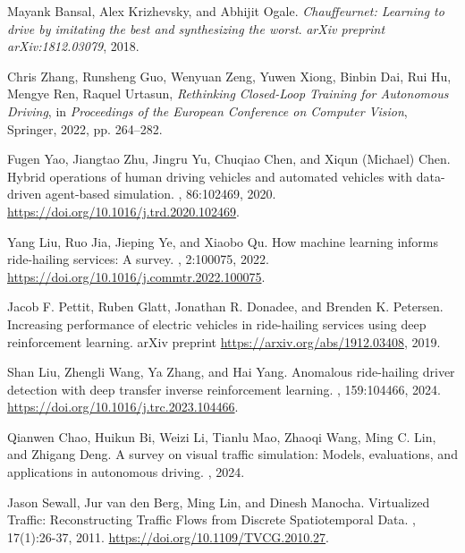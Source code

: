 \documentclass[lettersize,journal]{IEEEtran}
\begin{document}
\begin{thebibliography}{1}
Mayank Bansal, Alex Krizhevsky, and Abhijit Ogale.
\newblock \emph{Chauffeurnet: Learning to drive by imitating the best and synthesizing the worst}.
\newblock \emph{arXiv preprint arXiv:1812.03079}, 2018.

Chris Zhang, Runsheng Guo, Wenyuan Zeng, Yuwen Xiong, Binbin Dai, Rui Hu, Mengye Ren, Raquel Urtasun,
\textit{Rethinking Closed-Loop Training for Autonomous Driving}, in \textit{Proceedings of the European Conference on Computer Vision}, Springer, 2022, pp. 264--282.


Fugen Yao, Jiangtao Zhu, Jingru Yu, Chuqiao Chen, and Xiqun (Michael) Chen.
\newblock Hybrid operations of human driving vehicles and automated vehicles with data-driven agent-based simulation.
, 86:102469, 2020.
\newblock \url{https://doi.org/10.1016/j.trd.2020.102469}.

Yang Liu, Ruo Jia, Jieping Ye, and Xiaobo Qu.
\newblock How machine learning informs ride-hailing services: A survey.
, 2:100075, 2022.
\newblock \url{https://doi.org/10.1016/j.commtr.2022.100075}.

Jacob F. Pettit, Ruben Glatt, Jonathan R. Donadee, and Brenden K. Petersen.
\newblock Increasing performance of electric vehicles in ride-hailing services using deep reinforcement learning.
\newblock arXiv preprint \url{https://arxiv.org/abs/1912.03408}, 2019.

Shan Liu, Zhengli Wang, Ya Zhang, and Hai Yang.
\newblock Anomalous ride-hailing driver detection with deep transfer inverse reinforcement learning.
, 159:104466, 2024.
\newblock \url{https://doi.org/10.1016/j.trc.2023.104466}.

Qianwen Chao, Huikun Bi, Weizi Li, Tianlu Mao, Zhaoqi Wang, Ming C. Lin, and Zhigang Deng.
\newblock A survey on visual traffic simulation: Models, evaluations, and applications in autonomous driving.
, 2024.

Jason Sewall, Jur van den Berg, Ming Lin, and Dinesh Manocha.
\newblock Virtualized Traffic: Reconstructing Traffic Flows from Discrete Spatiotemporal Data.
, 17(1):26-37, 2011.
\newblock \url{https://doi.org/10.1109/TVCG.2010.27}.


\end{thebibliography}
\end{document}
